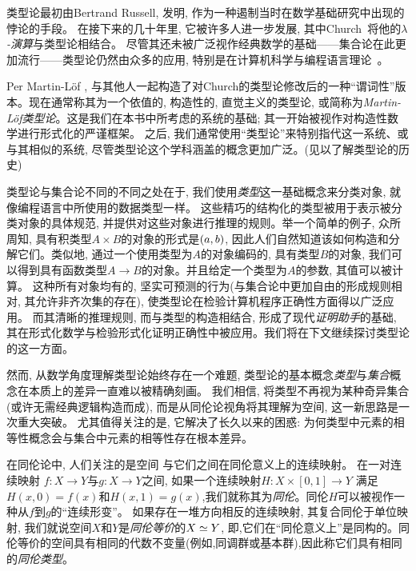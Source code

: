类型论最初由Bertrand Russell\cite{Russell:1908}, 发明, 作为一种遏制当时在数学基础研究中出现的悖论的手段。
在接下来的几十年里, 它被许多人进一步发展, 其中Church~\cite{Church:1940tu, Church:1941tc}将他的\textit{$\lambda$-演算}与类型论相结合。
尽管其还未被广泛视作经典数学的基础——集合论在此更加流行——类型论仍然由众多的应用, 特别是在计算机科学与编程语言理论~\cite{Pierce-TAPL}。

%
%
%

Per Martin-L\"{o}f \cite{Martin-Lof-1972,Martin-Lof-1973,Martin-Lof-1979,martin-lof:bibliopolis}, 
与其他人一起构造了对Church的类型论修改后的一种``谓词性''版本。现在通常称其为一个依值的, 构造性的, 直觉主义的类型论, 
或简称为\emph{Martin\--L\"of类型论}。这是我们在本书中所考虑的系统的基础; 其一开始被视作对构造性数学进行形式化的严谨框架。
之后, 我们通常使用``类型论''来特别指代这一系统、或与其相似的系统, 尽管类型论这个学科涵盖的概念更加广泛。(见\cite{somma, kamar}以了解类型论的历史)

类型论与集合论不同的不同之处在于, 我们使用\emph{类型}这一基础概念来分类对象, 就像编程语言中所使用的数据类型一样。
这些精巧的结构化的类型被用于表示被分类对象的具体规范, 并提供对这些对象进行推理的规则。举一个简单的例子, 
众所周知, 具有积类型$A \times B$的对象的形式是${\mathopen{}(a, b)\mathclose{}}$, 因此人们自然知道该如何构造和分解它们。类似地, 通过一个使用类型为$A$的对象编码的, 
具有类型$B$的对象, 我们可以得到具有函数类型$A \to B$的对象。并且给定一个类型为$A$的参数, 其值可以被计算。
这种所有对象均有的, 坚实可预测的行为(与集合论中更加自由的形成规则相对, 其允许非齐次集的存在), 使类型论在检验计算机程序正确性方面得以广泛应用。
而其清晰的推理规则, 而与类型的构造相结合, 形成了现代\emph{证明助手}的基础, 
%
%
其在形式化数学与检验形式化证明正确性中被应用。我们将在下文继续探讨类型论的这一方面。

然而, 从数学角度理解类型论始终存在一个难题, 类型论的基本概念\emph{类型}与\emph{集合}概念在本质上的差异一直难以被精确刻画。
我们相信, 将类型不再视为某种奇异集合(或许无需经典逻辑构造而成), 而是从同伦论视角将其理解为空间, 这一新思路是一次重大突破。
尤其值得关注的是, 它解决了长久以来的困惑: 为何类型中元素的相等性概念会与集合中元素的相等性存在根本差异。

在同伦论中, 人们关注的是空间
%
与它们之间在同伦意义上的连续映射。
%
在一对连续映射 $f : X \to Y$与$g : X\to Y$之间, 如果一个连续映射$H : X \times [0,  1] \to Y$
满足$H(x, 0) = f (x)$和$H(x, 1) = g(x)$,我们就称其为\emph{同伦}。同伦$H$可以被视作一种从$f$到$g$的``连续形变''。
%
如果存在一堆方向相反的连续映射, 其复合同伦于单位映射, 我们就说空间$X$和$Y$是\emph{同伦等价}的$X \simeq Y$,
%
即,它们在``同伦意义上''是同构的。同伦等价的空间具有相同的代数不变量(例如,同调群或基本群),因此称它们具有相同的\emph{同伦类型}。

